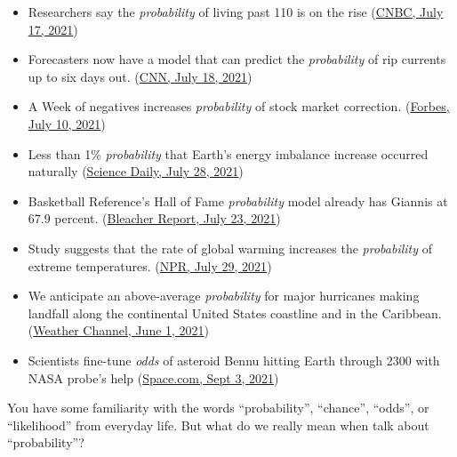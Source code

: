 \documentclass[
  letterpaper,
  DIV=11,
  numbers=noendperiod]{scrreprt}
\providecommand{\tightlist}{%
  \setlength{\itemsep}{0pt}\setlength{\parskip}{0pt}}
\theoremstyle{plain}
\theoremstyle{definition}
\theoremstyle{definition}
\theoremstyle{definition}
\theoremstyle{remark}
\begin{document}
\begin{itemize}
\tightlist
\item
  Researchers say the \emph{probability} of living past 110 is on the
  rise
  (\href{https://www.cnbc.com/2021/07/17/study-living-past-110-is-becoming-more-likely-longevity-tips.html}{CNBC,
  July 17, 2021})
\item
  Forecasters now have a model that can predict the \emph{probability}
  of rip currents up to six days out.
  (\href{https://www.cnn.com/2021/07/18/weather/weather-rip-currents-gulf-coast-great-lakes/index.html}{CNN,
  July 18, 2021})
\item
  A Week of negatives increases \emph{probability} of stock market
  correction.
  (\href{https://www.forbes.com/sites/johntobey/2021/07/10/opportunity-ahead-a-week-of-negatives-increases-probability-of-stock-market-correction/?sh=5d67bfe32f4f}{Forbes,
  July 10, 2021})
\item
  Less than 1\% \emph{probability} that Earth's energy imbalance
  increase occurred naturally
  (\href{https://www.sciencedaily.com/releases/2021/07/210728150340.htm}{Science
  Daily, July 28, 2021})
\item
  Basketball Reference's Hall of Fame \emph{probability} model already
  has Giannis at 67.9 percent.
  (\href{https://bleacherreport.com/articles/2946241-giannis-epic-2021-nba-finals-sparks-new-debates-among-legends-historians}{Bleacher
  Report, July 23, 2021})
\item
  Study suggests that the rate of global warming increases the
  \emph{probability} of extreme temperatures.
  (\href{https://www.npr.org/transcripts/1022412575}{NPR, July 29,
  2021})
\item
  We anticipate an above-average \emph{probability} for major hurricanes
  making landfall along the continental United States coastline and in
  the Caribbean.
  (\href{https://weather.com/storms/hurricane/news/2021-05-20-atlantic-hurricane-season-2021-outlook-noaa-twc-may}{Weather
  Channel, June 1, 2021})
\item
  Scientists fine-tune \emph{odds} of asteroid Bennu hitting Earth
  through 2300 with NASA probe's help
  (\href{https://www.space.com/asteroid-bennu-osiris-rex-impact-odds}{Space.com,
  Sept 3, 2021})
\end{itemize}

You have some familiarity with the words ``probability'', ``chance'',
``odds'', or ``likelihood'' from everyday life. But what do we really
mean when talk about ``probability''?
\end{document}
